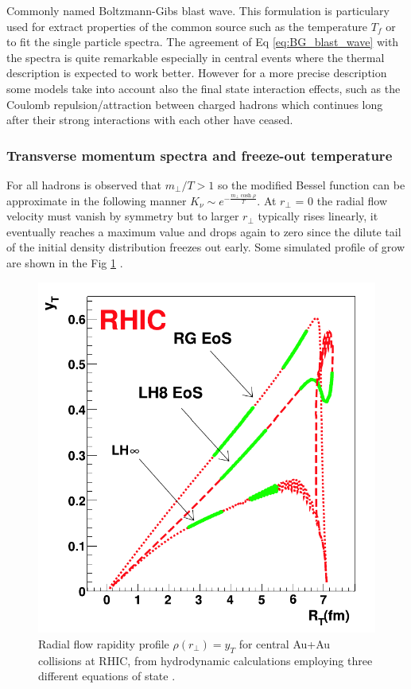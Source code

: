 \documentclass[12pt,a4paper]{book}
\begin{document}
	Commonly named Boltzmann-Gibs blast wave. This formulation is particulary used for extract properties of the common source such as the temperature $T_f$ or to fit the single particle spectra. The agreement of Eq \ref{eq:BG_blast_wave} with the spectra is quite remarkable especially in central events where the thermal description is expected to work better. However for a more precise description some models take into account also the final state interaction effects, such as the Coulomb repulsion/attraction between charged hadrons which continues long after their strong interactions with each other have ceased.
	
	
	\subsubsection{Transverse momentum spectra and freeze-out temperature}
	For all hadrons is observed that $m_\perp/T >1$ so the modified Bessel function can be approximate in the following manner $K_\nu \sim e^{- \frac{m_\perp \cosh \rho}{T}}$.  At $r_\perp$ = 0 the radial flow velocity must vanish by symmetry but to larger $r_\perp$ typically rises linearly, it eventually reaches a maximum value and drops again to zero since the dilute tail of the initial density distribution freezes out early. Some simulated profile of grow are shown in the Fig \ref{fig:radial_flow} \cite{teaney2001hydrodynamicdescriptionheavyion}.
	
	\begin{figure}[ht]
		\centering
		\includegraphics[width=0.6\linewidth]{pictures/radial_flow.png}
		\caption{Radial flow rapidity profile $\rho(r_\perp)= y_T$ for central Au+Au collisions at RHIC, from hydrodynamic calculations employing three different equations of state \cite{EvolutionofcollisionsandQGP}.}
		\label{fig:radial_flow} 
	\end{figure}
	
\end{document}
